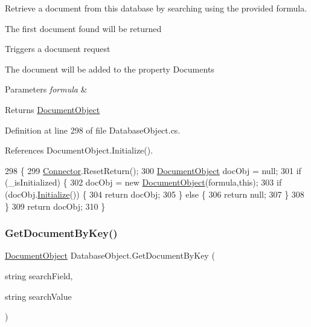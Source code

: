 Retrieve a document from this database by searching using the provided formula. 

The first document found will be returned

Triggers a document request

The document will be added to the property \textquotesingle{}Documents\textquotesingle{}


\begin{DoxyParams}{Parameters}
{\em formula} & \\
\hline
\end{DoxyParams}
\begin{DoxyReturn}{Returns}
\hyperlink{class_document_object}{Document\+Object}
\end{DoxyReturn}


Definition at line 298 of file Database\+Object.\+cs.



References Document\+Object.\+Initialize().


\begin{DoxyCode}
298                                                                \{
299         \hyperlink{class_connector}{Connector}.ResetReturn();
300         \hyperlink{class_document_object}{DocumentObject} docObj = null;
301         \textcolor{keywordflow}{if} (\_isInitialized) \{
302             docObj = \textcolor{keyword}{new} \hyperlink{class_document_object}{DocumentObject}(formula,\textcolor{keyword}{this});
303             \textcolor{keywordflow}{if} (docObj.\hyperlink{class_document_object_af4298d6cfbb9ea60643d9995309b73f1}{Initialize}()) \{
304                 \textcolor{keywordflow}{return} docObj;
305             \} \textcolor{keywordflow}{else} \{
306                 \textcolor{keywordflow}{return} null;
307             \}
308         \}
309         \textcolor{keywordflow}{return} docObj;
310     \}
\end{DoxyCode}
\mbox{\label{class_database_object_a57bfc77d2754236cbcf6ac30a90da529}} 
\subsubsection{\texorpdfstring{Get\+Document\+By\+Key()}{GetDocumentByKey()}}
{\footnotesize\ttfamily \hyperlink{class_document_object}{Document\+Object} Database\+Object.\+Get\+Document\+By\+Key (\begin{DoxyParamCaption}\item[{string}]{search\+Field,  }\item[{string}]{search\+Value }\end{DoxyParamCaption})}



